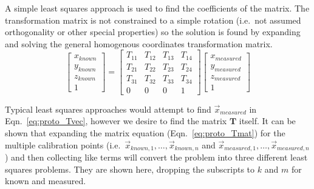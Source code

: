 A simple least squares approach is used to find the coefficients of the matrix. %
The transformation matrix is not constrained to a simple rotation (i.e.\ not assumed orthogonality or other special properties) so the solution is found by expanding and solving the general homogenous coordinates transformation matrix.
\begin{equation}
    \begin{bmatrix}
        x_{known} \\
        y_{known} \\
        z_{known} \\
        1
    \end{bmatrix} =
    \begin{bmatrix}
        T_{11} & T_{12} & T_{13} &T_{14} \\
        T_{21} & T_{22} & T_{23} &T_{24} \\
        T_{31} & T_{32} & T_{33} &T_{34} \\
        0 & 0 & 0 & 1
    \end{bmatrix}
    \begin{bmatrix}
        x_{measured} \\
        y_{measured} \\
        z_{measured} \\
        1
    \end{bmatrix}
    \label{eq:proto_Tmat}
\end{equation}

Typical least squares approaches would attempt to find $\vec{x}_{measured}$ in Eqn.\ \ref{eq:proto_Tvec}, however we desire to find the matrix $\mathbf{T}$ itself.
It can be shown that expanding the matrix equation (Eqn.\ \ref{eq:proto_Tmat}) for the multiple calibration points (i.e.\ $\vec{x}_{known,1},\dots,\vec{x}_{known,n}$ and $\vec{x}_{measured,1},\dots,\vec{x}_{measured,n}$) and then collecting like terms will convert the problem into three different least squares problems.
They are shown here, dropping the subscripts to $k$ and $m$ for known and measured.

